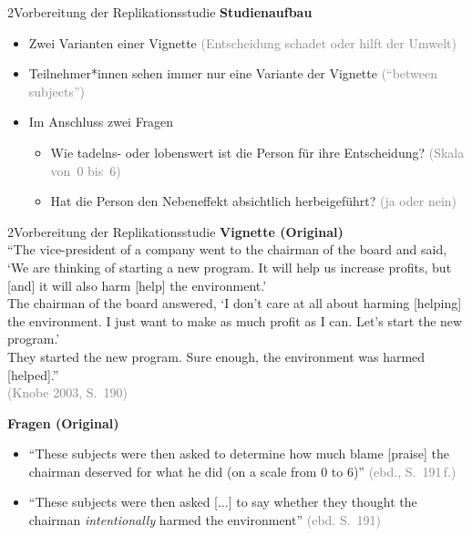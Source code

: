 \documentclass[xcolor=table,9pt,aspectratio=169]{beamer}
\begin{document}
\begin{frame}{\vspace*{10mm}2\hspace*{1em}Vorbereitung der Replikationsstudie}
\textbf{Studienaufbau}\\
\begin{itemize}
   \item Zwei Varianten einer Vignette \textcolor{gray}{(Entscheidung schadet oder hilft der Umwelt)}
   \item Teilnehmer*innen sehen immer nur eine Variante der Vignette \textcolor{gray}{(\enquote{between subjects})}
   \item Im Anschluss zwei Fragen
   \begin{itemize}
      \item Wie tadelns- oder lobenswert ist die Person für ihre Entscheidung? \textcolor{gray}{(Skala von~0 bis~6)}
      \item Hat die Person den Nebeneffekt absichtlich herbeigeführt? \textcolor{gray}{(ja oder nein)}
   \end{itemize}
\end{itemize}
\end{frame}


\begin{frame}{\vspace*{10mm}2\hspace*{1em}Vorbereitung der Replikationsstudie}
\textbf{Vignette (Original)}\\
\smallskip
\enquote{The vice-president of a company went to the chairman of the board and said, \enquote{We are thinking of starting a new program. It will help us increase profits, but \textcolor{blue2}{[and]} it will also harm \textcolor{blue2}{[help]} the environment.}\\\vspace{0.25em}
The chairman of the board answered, \enquote{I don't care at all about harming \textcolor{blue2}{[helping]} the environment. I just want to make as much profit as I can. Let's start the new program.}\\\vspace{0.25em}
They started the new program. Sure enough, the environment was harmed \textcolor{blue2}{[helped]}.}\\
\textcolor{gray}{(Knobe 2003, S.~190)}

\bigskip
\textbf{Fragen (Original)}\\
\begin{itemize}
   \item \enquote{These subjects were then asked to determine how much blame \textcolor{blue2}{[praise]} the chairman deserved for what he did (on a scale from 0 to 6)} \textcolor{gray}{(ebd., S.~191\,f.)}
   \item \enquote{These subjects were then asked [$\ldots$] to say whether they thought the chairman \textit{intentionally} harmed the environment} \textcolor{gray}{(ebd. S.~191)}
\end{itemize}
\end{frame}
\end{document}
